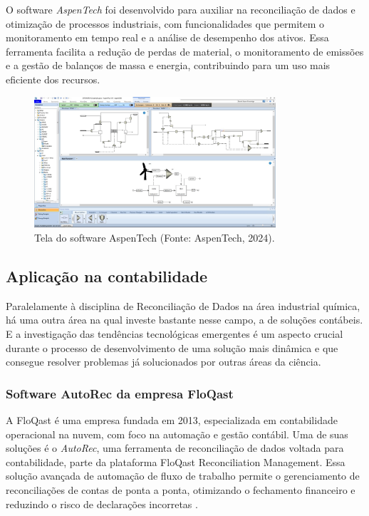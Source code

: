 O software \textit{AspenTech} foi desenvolvido para auxiliar na reconciliação de dados e otimização de processos industriais, com funcionalidades que permitem o monitoramento em tempo real e a análise de desempenho dos ativos. Essa ferramenta facilita a redução de perdas de material, o monitoramento de emissões e a gestão de balanços de massa e energia, contribuindo para um uso mais eficiente dos recursos.

\begin{figure}[htbp!]
	\centering
	\includegraphics[width=0.8\textwidth]{figuras/aspen-aspentech.png}
	\caption{Tela do software AspenTech (Fonte: AspenTech, 2024).}
	\label{fig:AspenTech}
\end{figure}

\subsection{Aplicação na contabilidade}

Paralelamente à disciplina de Reconciliação de Dados na área industrial química, há uma outra área na qual investe bastante nesse campo, a de soluções contábeis. E a investigação das tendências tecnológicas emergentes é um aspecto crucial durante o processo de desenvolvimento de uma solução mais dinâmica e que consegue resolver problemas já solucionados por outras áreas da ciência.

\subsubsection{Software AutoRec da empresa FloQast}

A FloQast é uma empresa fundada em 2013, especializada em contabilidade operacional na nuvem, com foco na automação e gestão contábil. Uma de suas soluções é o \textit{AutoRec}, uma ferramenta de reconciliação de dados voltada para contabilidade, parte da plataforma FloQast Reconciliation Management. Essa solução avançada de automação de fluxo de trabalho permite o gerenciamento de reconciliações de contas de ponta a ponta, otimizando o fechamento financeiro e reduzindo o risco de declarações incorretas \cite{floqast}.

